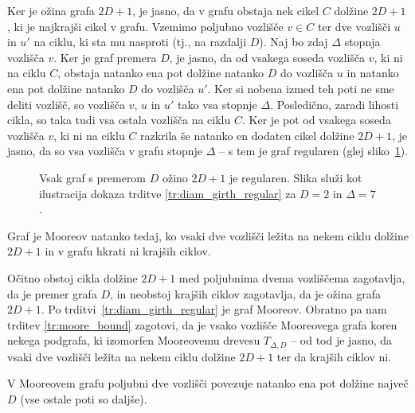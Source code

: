 \documentclass[fin1, tisk]{fmfdelo}
\begin{document}
\begin{dokaz}
    Ker je ožina grafa $2D+1$, je jasno, da v grafu obstaja nek cikel $C$ dolžine $2D+1$, ki je najkrajši cikel v grafu.
    Vzemimo poljubno vozlišče $v \in C$ ter dve vozlišči $u$ in $u'$ na ciklu, ki sta mu nasproti (tj., na razdalji $D$).
    Naj bo zdaj $\Delta$ stopnja vozlišča $v$. Ker je graf premera $D$, je jasno, da od vsakega soseda vozlišča $v$, ki ni na ciklu $C$, 
    obstaja natanko ena pot dolžine natanko $D$ do vozlišča $u$ in natanko ena pot dolžine natanko $D$ do vozlišča $u'$. 
    Ker si nobena izmed teh poti ne sme deliti vozlišč, so vozlišča $v$, $u$ in $u'$ tako vsa stopnje $\Delta$.
    Posledično, zaradi lihosti cikla, so taka tudi vsa ostala vozlišča na ciklu $C$.
    Ker je pot od vsakega soseda vozlišča $v$, ki ni na ciklu $C$ razkrila še natanko en dodaten cikel dolžine $2D+1$, je jasno,
    da so vsa vozlišča v grafu stopnje $\Delta$ -- s tem je graf regularen (glej sliko~\ref{fig:diam_girth_regular}).
\end{dokaz}


\begin{figure}[ht]
    \centering
    \def\svgwidth{\columnwidth}
    \caption{Vsak graf s premerom $D$ ožino $2D+1$ je regularen. Slika služi kot 
    ilustracija dokaza trditve \ref{tr:diam_girth_regular} za $D=2$ in $\Delta=7$.}
    \label{fig:diam_girth_regular}
\end{figure}

\begin{trditev}\label{tr:v_nekem_ciklu}
    Graf je Mooreov natanko tedaj, ko vsaki dve vozlišči ležita na nekem ciklu dolžine $2D+1$ in v 
    grafu hkrati ni krajših ciklov.
\end{trditev}

\begin{dokaz}
    Očitno obstoj cikla dolžine $2D+1$ med poljubnima dvema vozliščema zagotavlja, da je premer grafa $D$,
    in neobstoj krajših ciklov zagotavlja, da je ožina grafa $2D+1$. Po trditvi~\ref{tr:diam_girth_regular} je 
    graf Mooreov. Obratno pa nam trditev \ref{tr:moore_bound} zagotovi, da je vsako vozlišče Mooreovega grafa koren nekega
    podgrafa, ki izomorfen Mooreovemu drevesu $T_{\Delta, D}$ -- od tod je jasno, da vsaki dve vozlišči ležita na nekem ciklu dolžine $2D+1$ 
    ter da krajših ciklov ni.
\end{dokaz}

\begin{trditev}\label{tr:ena_najkrajsa_pot}
    V Mooreovem grafu poljubni dve vozlišči povezuje natanko ena pot dolžine največ $D$ (vse ostale poti so daljše).
\end{trditev}
\end{document}
